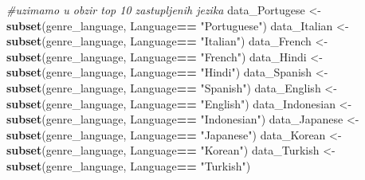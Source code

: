 \documentclass[
]{article}
\newenvironment{Shaded}{\begin{snugshade}}{\end{snugshade}}
\newcommand{\CommentTok}[1]{\textcolor[rgb]{0.56,0.35,0.01}{\textit{#1}}}
\newcommand{\FunctionTok}[1]{\textcolor[rgb]{0.13,0.29,0.53}{\textbf{#1}}}
\newcommand{\NormalTok}[1]{#1}
\newcommand{\OtherTok}[1]{\textcolor[rgb]{0.56,0.35,0.01}{#1}}
\newcommand{\SpecialCharTok}[1]{\textcolor[rgb]{0.81,0.36,0.00}{\textbf{#1}}}
\newcommand{\StringTok}[1]{\textcolor[rgb]{0.31,0.60,0.02}{#1}}
\begin{document}
\begin{Shaded}
\begin{Highlighting}[]
\CommentTok{\#uzimamo u obzir top 10 zastupljenih jezika}
\NormalTok{data\_Portugese }\OtherTok{\textless{}{-}} \FunctionTok{subset}\NormalTok{(genre\_language,  Language}\SpecialCharTok{==} \StringTok{"Portuguese"}\NormalTok{)}
\NormalTok{data\_Italian }\OtherTok{\textless{}{-}} \FunctionTok{subset}\NormalTok{(genre\_language,  Language}\SpecialCharTok{==} \StringTok{"Italian"}\NormalTok{)}
\NormalTok{data\_French }\OtherTok{\textless{}{-}} \FunctionTok{subset}\NormalTok{(genre\_language,  Language}\SpecialCharTok{==} \StringTok{"French"}\NormalTok{)}
\NormalTok{data\_Hindi }\OtherTok{\textless{}{-}} \FunctionTok{subset}\NormalTok{(genre\_language,  Language}\SpecialCharTok{==} \StringTok{"Hindi"}\NormalTok{)}
\NormalTok{data\_Spanish }\OtherTok{\textless{}{-}} \FunctionTok{subset}\NormalTok{(genre\_language,  Language}\SpecialCharTok{==} \StringTok{"Spanish"}\NormalTok{)}
\NormalTok{data\_English }\OtherTok{\textless{}{-}} \FunctionTok{subset}\NormalTok{(genre\_language,  Language}\SpecialCharTok{==} \StringTok{"English"}\NormalTok{)}
\NormalTok{data\_Indonesian }\OtherTok{\textless{}{-}} \FunctionTok{subset}\NormalTok{(genre\_language,  Language}\SpecialCharTok{==} \StringTok{"Indonesian"}\NormalTok{)}
\NormalTok{data\_Japanese }\OtherTok{\textless{}{-}} \FunctionTok{subset}\NormalTok{(genre\_language,  Language}\SpecialCharTok{==} \StringTok{"Japanese"}\NormalTok{)}
\NormalTok{data\_Korean }\OtherTok{\textless{}{-}} \FunctionTok{subset}\NormalTok{(genre\_language,  Language}\SpecialCharTok{==} \StringTok{"Korean"}\NormalTok{)}
\NormalTok{data\_Turkish }\OtherTok{\textless{}{-}} \FunctionTok{subset}\NormalTok{(genre\_language,  Language}\SpecialCharTok{==} \StringTok{"Turkish"}\NormalTok{)}


\end{Highlighting}
\end{Shaded}
\end{document}
